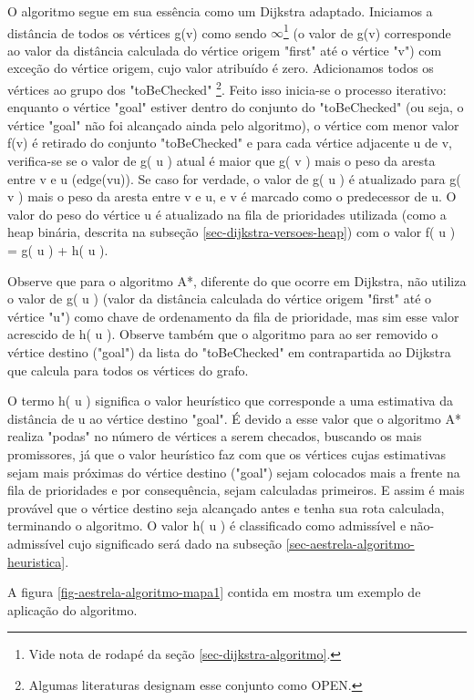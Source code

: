 O algoritmo segue em sua essência como um Dijkstra adaptado. Iniciamos a distância de todos os vértices g(v) como sendo $\infty$\footnote{Vide nota de rodapé da seção \ref{sec-dijkstra-algoritmo}.} (o valor de g(v) corresponde ao valor da distância calculada do vértice origem "first" até o vértice "v") com exceção do vértice origem, cujo valor atribuído é zero. Adicionamos todos os vértices ao grupo dos "toBeChecked" \footnote{Algumas literaturas designam esse conjunto como OPEN.}. Feito isso inicia-se o processo iterativo: enquanto o vértice "goal" estiver dentro do conjunto do "toBeChecked" (ou seja, o vértice "goal" não foi alcançado ainda pelo algoritmo), o vértice com menor valor f(v) é retirado do conjunto "toBeChecked" e para cada vértice adjacente u de v, verifica-se se o valor de g( u ) atual é maior que g( v ) mais o peso da aresta entre v e u (edge(vu)). Se caso for verdade, o valor de g( u ) é atualizado para g( v ) mais o peso da aresta entre v e u, e v é marcado como o predecessor de u. O valor do peso do vértice u é atualizado na fila de prioridades utilizada (como a heap binária, descrita na subseção \ref{sec-dijkstra-versoes-heap}) com o valor f( u ) = g( u ) + h( u ).

Observe que para o algoritmo A*, diferente do que ocorre em Dijkstra, não utiliza o valor de g( u ) (valor da distância calculada do vértice origem "first" até o vértice "u") como chave de ordenamento da fila de prioridade, mas sim esse valor acrescido de h( u ). Observe também que o algoritmo para ao ser removido o vértice destino ("goal") da lista do "toBeChecked" em contrapartida ao Dijkstra que calcula para todos os vértices do grafo.

O termo h( u ) significa o valor heurístico que corresponde a uma estimativa da distância de u ao vértice destino "goal". É devido a esse valor que o algoritmo A* realiza "podas" no número de vértices a serem checados, buscando os mais promissores, já que o valor heurístico faz com que os vértices cujas estimativas sejam mais próximas do vértice destino ("goal") sejam colocados mais a frente na fila de prioridades e por consequência, sejam calculadas primeiros. E assim é mais provável que o vértice destino seja alcançado antes e tenha sua rota calculada, terminando o algoritmo. O valor h( u ) é classificado como admissível e não-admissível cujo significado será dado na subseção \ref{sec-aestrela-algoritmo-heuristica}.

A figura \ref{fig-aestrela-algoritmo-mapa1} contida em  mostra um exemplo de aplicação do algoritmo.

